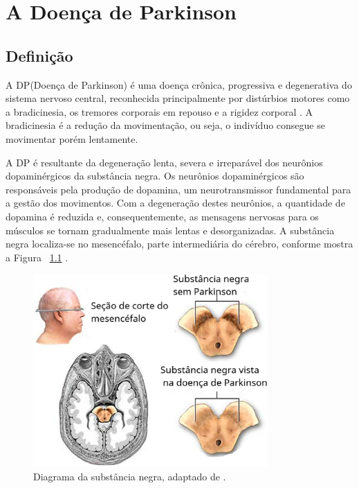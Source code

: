 \chapter{A Doença de Parkinson}
\section{Definição}

A DP(Doença de Parkinson) é uma doença crônica, progressiva e degenerativa do sistema nervoso central, reconhecida principalmente por distúrbios motores como a bradicinesia, os tremores corporais em repouso e a rigidez corporal \cite{da2016aspectos}. A bradicinesia é a redução da movimentação, ou seja, o indivíduo consegue se movimentar porém lentamente. 

A DP é resultante da degeneração lenta, severa e irreparável dos neurônios dopaminérgicos da substância negra. Os neurônios dopaminérgicos são responsáveis pela produção de dopamina, um neurotransmissor fundamental para a gestão dos movimentos. Com a degeneração destes neurônios, a quantidade de dopamina é reduzida e, consequentemente, as mensagens nervosas para os músculos se tornam gradualmente mais lentas e desorganizadas. A substância negra localiza-se no mesencéfalo, parte intermediária do cérebro, conforme mostra a Figura ~\ref{substanciaNegra} \cite{eftaxias2015detection}.

\begin{figure}[!htb]
	\centering
	\includegraphics[width=0.8\textwidth]{figuras/subNegra.eps}
	\caption{Diagrama da substância negra, adaptado de .}
	\label{substanciaNegra}
\end{figure}

